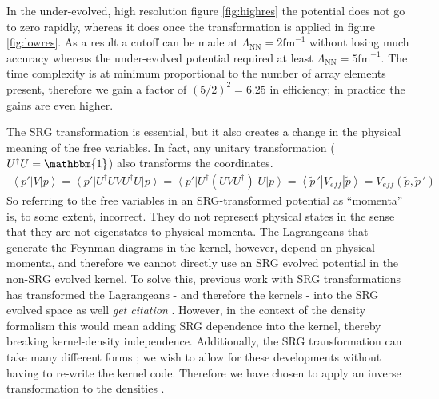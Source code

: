 \documentclass[a4paper,11pt]{article}
\newcommand{\br}[1]{\left\langle #1 \right |}
\newcommand{\kt}[1]{\left| #1 \right \rangle}
\newcommand{\LamNN}{\Lambda_{\mathrm{NN}}}
\newcommand{\ques}[1]{\color{red}\textit{ #1 }\color{black}}
\begin{document}
In the under-evolved, high resolution figure \ref{fig:highres} the potential does 
not go to zero rapidly, whereas it does once the
transformation is applied in figure \ref{fig:lowres}. As a
result a cutoff can be made at $\LamNN=2 \mathrm{fm}^{-1}$ without
losing much accuracy whereas the under-evolved potential required at least $\LamNN=5 \mathrm{fm}^{-1}$.
The time complexity is at minimum proportional to the number of array elements
present, therefore we gain a factor of $(5/2)^2=6.25$ in efficiency;
in practice the gains are even higher.

The SRG transformation is essential, but it also creates a
change in the physical meaning of the free variables.
In fact, any unitary transformation ($U^\dag U =\mathbbm{1}$) also transforms the coordinates.
\begin{align}
  \br{p'}V\kt{p} 
  = \br{p'} U^\dag U V U^\dag U \kt{p}
  = \br{p'} U^\dag\left( U V U^\dag\right)\;U
  \kt{p}
  = \br{\widetilde{p}\,'} V_{eff}
  \kt{\widetilde{p}}=V_{eff}(\widetilde{p},\widetilde{p}\,')
\end{align}
So referring to the free variables in an SRG-transformed potential as
``momenta'' is, to some extent, incorrect.
They do not represent physical states  in the sense that they are not eigenstates to physical momenta.
The Lagrangeans that generate the Feynman diagrams in the kernel, however,
depend on physical momenta, and therefore we cannot directly use an SRG
evolved potential in the non-SRG evolved kernel.
To solve this, previous work with SRG transformations has transformed the
Lagrangeans - and therefore the kernels - into the SRG evolved space
as well\ques{get citation}.
However, in the context of the density formalism this would mean adding SRG
dependence into the kernel, thereby breaking kernel-density independence.
Additionally, the SRG transformation can take many different forms \cite{SRG, Furnstahl2013};
we wish to allow for these developments
without having to re-write the kernel code.
Therefore we have chosen to apply an inverse
transformation to the densities \cite{XiangXiang}.
\end{document}
